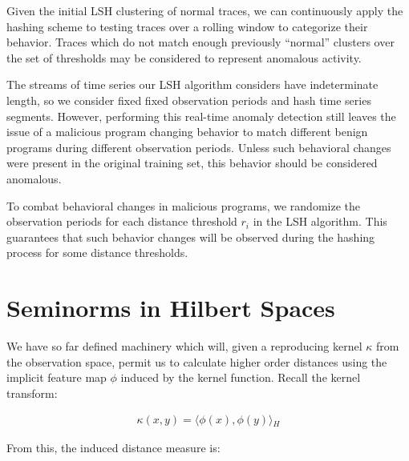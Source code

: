 \documentclass[a4paper]{article}
\newcommand{\innerproduct}[2]{\langle{}#1,#2\rangle{}}
\theoremstyle{def}
\theoremstyle{thm}
\begin{document}
Given the initial LSH clustering of normal traces, we can continuously apply the hashing scheme to testing traces over a rolling window to categorize their behavior.
Traces which do not match enough previously ``normal'' clusters over the set of thresholds may be considered to represent anomalous activity.

The streams of time series our LSH algorithm considers have indeterminate length, so we consider fixed fixed observation periods and hash time series segments.
However, performing this real-time anomaly detection still leaves the issue of a malicious program changing behavior to match different benign programs during different observation periods.
Unless such behavioral changes were present in the original training set, this behavior should be considered anomalous.

To combat behavioral changes in malicious programs, we randomize the observation periods for each distance threshold $r_i$ in the LSH algorithm.
This guarantees that such behavior changes will be observed during the hashing process for some distance thresholds.

\iffalse
\subsection{Unsupervised, Intelligent Adversary}

A similar approach to Section~\ref{subsec:anomaly_detection} can be applied without a predetermined training set for time series classification through clustering.
Adjusting the set of threshold values confers the notion of closeness, which may be used to determine which sets of output traces resulted from the same input to a program, for example.
\fi

\section{Seminorms in Hilbert Spaces}
\label{sec:sobolev}

We have so far defined machinery which will, given a reproducing kernel $\kappa$ from the observation space, permit us to calculate higher order distances using the implicit feature map $\phi$ induced by the kernel function.
Recall the kernel transform:

\begin{align}
    \kappa(x,y) = \innerproduct{\phi(x)}{\phi(y)}_H
\end{align}

From this, the induced distance measure is:
\end{document}
